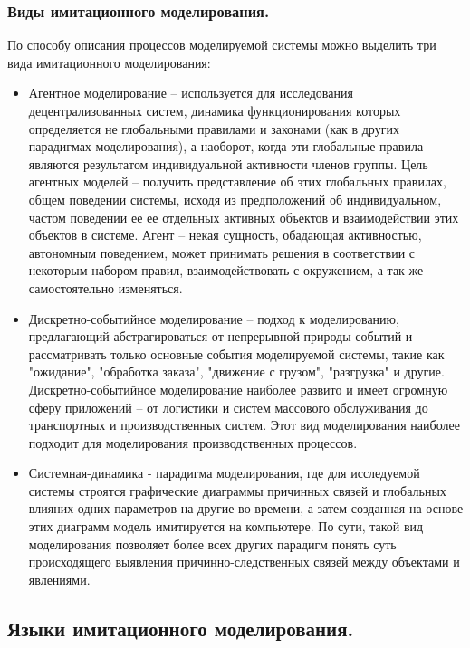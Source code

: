 \subsubsection{Виды имитационного моделирования.}

    По способу описания процессов моделируемой системы можно выделить три вида имитационного моделирования:

\begin{itemize}
    \item Агентное моделирование -- используется для исследования децентрализованных систем, динамика функционирования которых определяется не глобальными правилами и законами (как в других парадигмах моделирования), а наоборот, когда эти глобальные правила являются результатом индивидуальной активности членов группы. Цель агентных моделей -- получить представление об этих глобальных правилах, общем поведении системы, исходя из предположений об индивидуальном, частом поведении ее ее отдельных активных объектов и взаимодействии этих объектов в системе. Агент -- некая сущность, обадающая активностью, автономным поведением, может принимать решения в соответствии с некоторым набором правил, взаимодействовать с окружением, а так же самостоятельно изменяться.
    \item Дискретно-событийное моделирование -- подход к моделированию, предлагающий абстрагироваться от непрерывной природы событий и рассматривать только основные события моделируемой системы, такие как "ожидание", "обработка заказа", "движение с грузом", "разгрузка" и другие. Дискретно-событийное моделирование наиболее развито и имеет огромную сферу приложений -- от логистики и систем массового обслуживания до транспортных и производственных систем. Этот вид моделирования наиболее подходит для моделирования производственных процессов.
    \item Системная-динамика - парадигма моделирования, где для исследуемой системы строятся графические диаграммы причинных связей и глобальных влияних одних параметров на другие во времени, а затем созданная на основе этих диаграмм модель имитируется на компьютере. По сути, такой вид моделирования позволяет более всех других парадигм понять суть происходящего выявления причинно-следственных связей между объектами и явлениями.
\end{itemize}

\subsection{Языки имитационного моделирования.}


